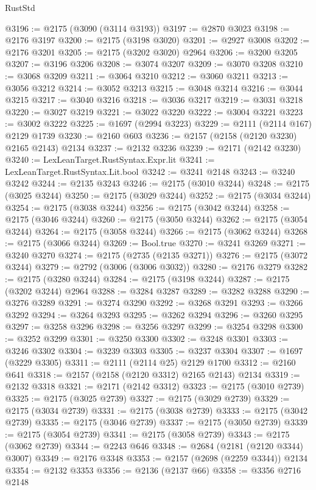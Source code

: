 \begin{lexlean}{RustStd}
\begin{coremodule}
@3196 := @2175 (@3090 (@3114 @3193))
@3197 := @2870 @3023
@3198 := @2176 @3197
@3200 := @2175 (@3198 @3020)
@3201 := @2927 @3008
@3202 := @2176 @3201
@3205 := @2175 (@3202 @3020) @2964
@3206 := @3200 @3205
@3207 := @3196 @3206
@3208 := @3074 @3207
@3209 := @3070 @3208
@3210 := @3068 @3209
@3211 := @3064 @3210
@3212 := @3060 @3211
@3213 := @3056 @3212
@3214 := @3052 @3213
@3215 := @3048 @3214
@3216 := @3044 @3215
@3217 := @3040 @3216
@3218 := @3036 @3217
@3219 := @3031 @3218
@3220 := @3027 @3219
@3221 := @3022 @3220
@3222 := @3004 @3221
@3223 := @3002 @3222
@3225 := @1697 (@2994 @3223)
@3229 := @2111 (@2114 @167) @2129 @1739
@3230 := @2160 @603
@3236 := @2157 (@2158 (@2120 @3230) @2165 @2143) @2134
@3237 := @2132 @3236
@3239 := @2171 (@2142 @3230)
@3240 := LexLeanTarget.RustSyntax.Expr.lit
@3241 := LexLeanTarget.RustSyntax.Lit.bool
@3242 := @3241 @2148
@3243 := @3240 @3242
@3244 := @2135 @3243
@3246 := @2175 (@3010 @3244)
@3248 := @2175 (@3025 @3244)
@3250 := @2175 (@3029 @3244)
@3252 := @2175 (@3034 @3244)
@3254 := @2175 (@3038 @3244)
@3256 := @2175 (@3042 @3244)
@3258 := @2175 (@3046 @3244)
@3260 := @2175 (@3050 @3244)
@3262 := @2175 (@3054 @3244)
@3264 := @2175 (@3058 @3244)
@3266 := @2175 (@3062 @3244)
@3268 := @2175 (@3066 @3244)
@3269 := Bool.true
@3270 := @3241 @3269
@3271 := @3240 @3270
@3274 := @2175 (@2735 (@2135 @3271))
@3276 := @2175 (@3072 @3244)
@3279 := @2792 (@3006 (@3006 @3032))
@3280 := @2176 @3279
@3282 := @2175 (@3280 @3244)
@3284 := @2175 (@3198 @3244)
@3287 := @2175 (@3202 @3244) @2964
@3288 := @3284 @3287
@3289 := @3282 @3288
@3290 := @3276 @3289
@3291 := @3274 @3290
@3292 := @3268 @3291
@3293 := @3266 @3292
@3294 := @3264 @3293
@3295 := @3262 @3294
@3296 := @3260 @3295
@3297 := @3258 @3296
@3298 := @3256 @3297
@3299 := @3254 @3298
@3300 := @3252 @3299
@3301 := @3250 @3300
@3302 := @3248 @3301
@3303 := @3246 @3302
@3304 := @3239 @3303
@3305 := @3237 @3304
@3307 := @1697 (@3229 @3305)
@3311 := @2111 (@2114 @25) @2129 @1700
@3312 := @2160 @641
@3318 := @2157 (@2158 (@2120 @3312) @2165 @2143) @2134
@3319 := @2132 @3318
@3321 := @2171 (@2142 @3312)
@3323 := @2175 (@3010 @2739)
@3325 := @2175 (@3025 @2739)
@3327 := @2175 (@3029 @2739)
@3329 := @2175 (@3034 @2739)
@3331 := @2175 (@3038 @2739)
@3333 := @2175 (@3042 @2739)
@3335 := @2175 (@3046 @2739)
@3337 := @2175 (@3050 @2739)
@3339 := @2175 (@3054 @2739)
@3341 := @2175 (@3058 @2739)
@3343 := @2175 (@3062 @2739)
@3344 := @2243 @646
@3348 := @2684 (@2181 (@2120 @3344) @3007)
@3349 := @2176 @3348
@3353 := @2157 (@2698 (@2259 @3344)) @2134
@3354 := @2132 @3353
@3356 := @2136 (@2137 @66)
@3358 := @3356 @2716 @2148

\end{coremodule}
\end{lexlean}
